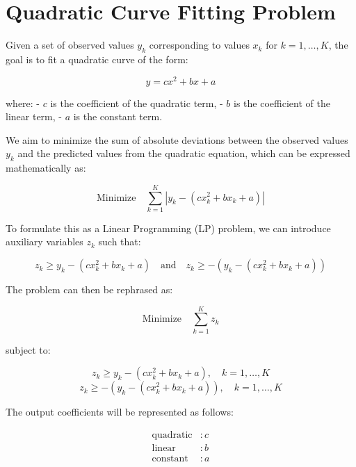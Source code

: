 \documentclass{article}
\begin{document}
\section*{Quadratic Curve Fitting Problem}

Given a set of observed values \( y_k \) corresponding to values \( x_k \) for \( k = 1, \ldots, K \), the goal is to fit a quadratic curve of the form:

\[
y = c x^2 + b x + a
\]

where:
- \( c \) is the coefficient of the quadratic term,
- \( b \) is the coefficient of the linear term,
- \( a \) is the constant term.

We aim to minimize the sum of absolute deviations between the observed values \( y_k \) and the predicted values from the quadratic equation, which can be expressed mathematically as:

\[
\text{Minimize} \quad \sum_{k=1}^{K} |y_k - (c x_k^2 + b x_k + a)|
\]

To formulate this as a Linear Programming (LP) problem, we can introduce auxiliary variables \( z_k \) such that:

\[
z_k \geq y_k - (c x_k^2 + b x_k + a) \quad \text{and} \quad z_k \geq -(y_k - (c x_k^2 + b x_k + a))
\]

The problem can then be rephrased as:

\[
\text{Minimize} \quad \sum_{k=1}^{K} z_k
\]

subject to:

\[
z_k \geq y_k - (c x_k^2 + b x_k + a), \quad k = 1, \ldots, K
\]
\[
z_k \geq -(y_k - (c x_k^2 + b x_k + a)), \quad k = 1, \ldots, K
\]

The output coefficients will be represented as follows:

\[
\begin{align*}
\text{quadratic} & : c \\
\text{linear} & : b \\
\text{constant} & : a
\end{align*}
\]
\end{document}
